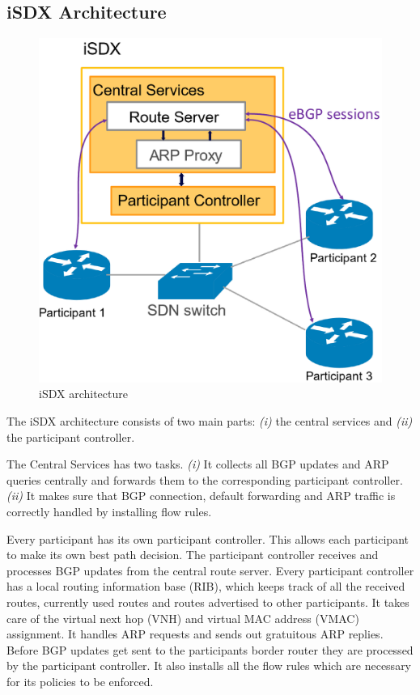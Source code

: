\subsection{\label{chapter2:iSDX:iSDX_architecture}iSDX Architecture}
\begin{figure}[h]
\center
\includegraphics[scale = 0.3]{Figures/isdx_architectur_cropped.pdf}
\caption{iSDX architecture}
\end{figure}

The iSDX architecture consists of two main parts: \emph{(i)} the central services and \emph{(ii)} the participant controller.

The Central Services has two tasks. \emph{(i)} It collects all BGP updates and ARP queries centrally and forwards them to the corresponding participant controller. \emph{(ii)} It makes sure that BGP connection, default forwarding and ARP traffic is correctly handled by installing flow rules.

Every participant has its own participant controller. This allows each participant to make its own best path decision. The participant controller receives and processes BGP updates from the central route server. Every participant controller has a local routing information base (RIB), which keeps track of all the received routes, currently used routes and routes advertised to other participants. It takes care of the virtual next hop (VNH) and virtual MAC address (VMAC) assignment. It handles ARP requests and sends out gratuitous ARP replies. Before BGP updates get sent to the participants border router they are processed by the participant controller. It also installs all the flow rules which are necessary for its policies to be enforced.

